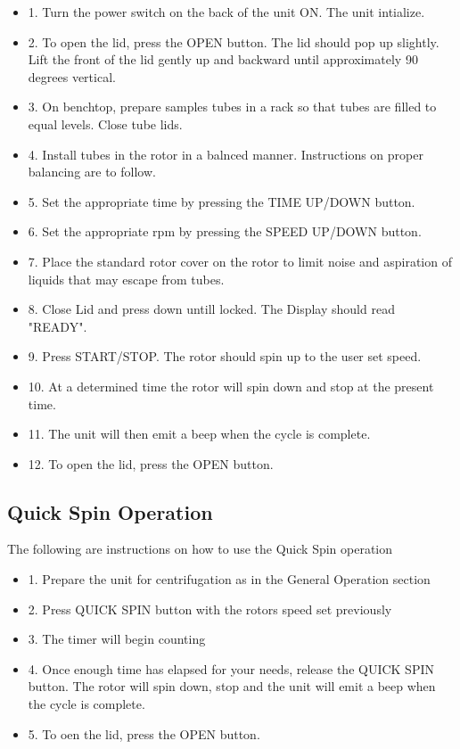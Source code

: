 \documentclass[12pt]{../SOP3_beta}\usepackage[]{graphicx}\usepackage[]{color}
\begin{document}
\begin{itemize}
  \item 1. Turn the power switch on the back of the unit ON. The unit intialize.
  \item 2. To open the lid, press the OPEN button. The lid should pop up slightly. Lift the front of the lid gently up and backward until approximately 90 degrees vertical.
  \item 3. On benchtop, prepare samples tubes in a rack so that tubes are filled to equal levels. Close tube lids.
  \item 4. Install tubes in the rotor in a balnced manner. Instructions on proper balancing are to follow.
  \item 5. Set the appropriate time by pressing the TIME UP/DOWN button.
  \item 6. Set the appropriate rpm by pressing the SPEED UP/DOWN button.
  \item 7. Place the standard rotor cover on the rotor to limit noise and aspiration of liquids that may escape from tubes.
  \item 8. Close Lid and press down untill locked. The Display should read "READY".
  \item 9. Press START/STOP. The rotor should spin up to the user set speed.
  \item 10. At a determined time the rotor will spin down and stop at the present time.
  \item 11. The unit will then emit a beep when the cycle is complete.
  \item 12. To open the lid, press the OPEN button.
\end{itemize}

\subsection*{Quick Spin Operation}

\NP The following are instructions on how to use the Quick Spin operation

\begin{itemize}
  \item 1. Prepare the unit for centrifugation as in the General Operation section
  \item 2. Press QUICK SPIN button with the rotors speed set previously
  \item 3. The timer will begin counting
  \item 4. Once enough time has elapsed for your needs, release the QUICK SPIN button. The rotor will spin down, stop and the unit will emit a beep when the cycle is complete.
  \item 5. To oen the lid, press the OPEN button.
\end{itemize}
\end{document}
